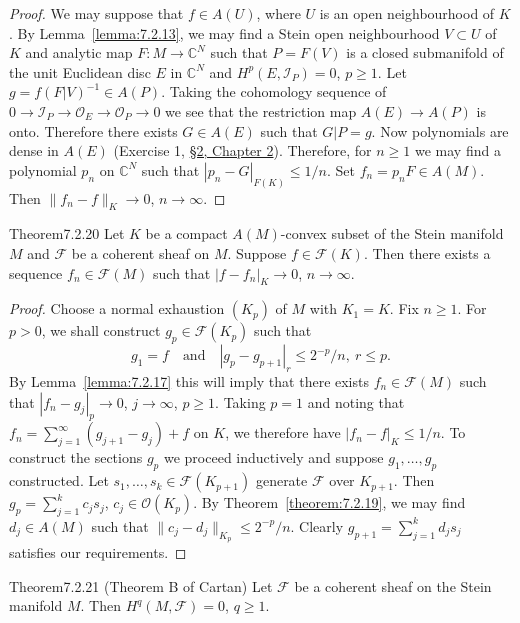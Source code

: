 \begin{proof}
We may suppose that $f\in A(U)$, where $U$ is an open neighbourhood of $K$. By Lemma~\ref{lemma:7.2.13}, we may find a Stein open neighbourhood $V\subset U$ of $K$ and analytic map $F:M\to\mathbb C^N$ such that $P=F(V)$ is a closed submanifold of the unit Euclidean disc $E$ in $\mathbb C^N$ and $H^p(E,\mathcal I_P)=0$, $p\geq1$. Let $g=f(F|V)^{-1}\in A(P)$. Taking the cohomology sequence of $0\to\mathcal I_P\to\mathcal O_E\to\mathcal O_P\to0$ we see that the restriction map $A(E)\to A(P)$ is onto. Therefore there exists $G\in A(E)$ such that $G|P=g$. Now polynomials are dense in $A(E)$ (Exercise 1, \hyperref[sec:2:2]{\S2, Chapter 2}). Therefore, for $n\geq1$ we may find a polynomial $p_n$ on $\mathbb C^N$ such that $|p_n-G|_{F(K)}\leq1/n$. Set $f_n=p_nF\in A(M)$. Then $\|f_n-f\|_K\to0$, $n\to\infty$.
\end{proof}
\begin{originaltheorem}{Theorem}{7.2.20}
Let $K$ be a compact $A(M)$-convex subset of the Stein manifold $M$ and $\mathcal F$ be a coherent sheaf on $M$. Suppose $f\in\mathcal F(K)$. Then there exists a sequence $f_n\in\mathcal F(M)$ such that $|f-f_n|_K\to0$, $n\to\infty$.
\end{originaltheorem}
\begin{proof}
Choose a normal exhaustion $(K_p)$ of $M$ with $K_1=K$. Fix $n\geq1$. For $p>0$, we shall construct $g_p\in\mathcal F(K_p)$ such that
\[
g_1=f\quad\text{and}\quad |g_p-g_{p+1}|_r\leq2^{-p}/n,\ r\leq p.
\]
By Lemma~\ref{lemma:7.2.17} this will imply that there exists $f_n\in\mathcal F(M)$ such that $|f_n-g_j|_p\to0$, $j\to\infty$, $p\geq1$. Taking $p=1$ and noting that $f_n=\sum_{j=1}^\infty(g_{j+1}-g_j)+f$ on $K$, we therefore have $|f_n-f|_K\leq1/n$.
To construct the sections $g_p$ we proceed inductively and suppose $g_1,\ldots,g_p$ constructed. Let $s_1,\ldots,s_k\in\mathcal F(K_{p+1})$ generate $\mathcal F$ over $K_{p+1}$. Then $g_p=\sum_{j=1}^k c_js_j$, $c_j\in\mathcal O(K_p)$. By Theorem~\ref{theorem:7.2.19}, we may find $d_j\in A(M)$ such that $\|c_j-d_j\|_{K_p}\leq2^{-p}/n$. Clearly $g_{p+1}=\sum_{j=1}^k d_js_j$ satisfies our requirements.
\end{proof}
\begin{originaltheorem}{Theorem}{7.2.21 (Theorem B of Cartan)}
Let $\mathcal F$ be a coherent sheaf on the Stein manifold $M$. Then $H^q(M,\mathcal F)=0$, $q\geq1$.
\end{originaltheorem}
